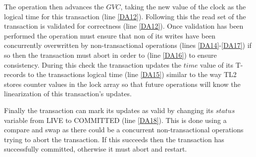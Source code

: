 \documentclass[runningheads,a4paper]{llncs}
\begin{document}
The operation then advances the $\mathit{GVC}$, taking the
new value of the clock as the logical time for this transaction (line \ref{DA12}).
Following this the read set of the transaction is validated for
correctness  (line \ref{DA12}). %
Once validation has been performed the operation must
ensure that non of its writes have been concurrently
overwritten by non-transactional operations (lines \ref{DA14}-\ref{DA17})
if so then the transaction must abort in order to (line \ref{DA16}) to ensure consistency.
During this check the transaction updates the $\mathit{time}$
value of its T-records to the transactions logical time (line \ref{DA15})
similar to the way TL2 stores counter values in the lock array
so that future operations will know the linearization of this transaction's updates.

Finally the
transaction can mark its updates as valid by 
changing its 
$\mathit{status}$ variable from LIVE to COMMITTED (line \ref{DA18}).
This is done using a compare and swap as there could be
a concurrent non-transactional operations trying to abort the transaction.  
If this succeeds then the transaction has successfully committed, otherwise
it must abort and restart.
\end{document}
